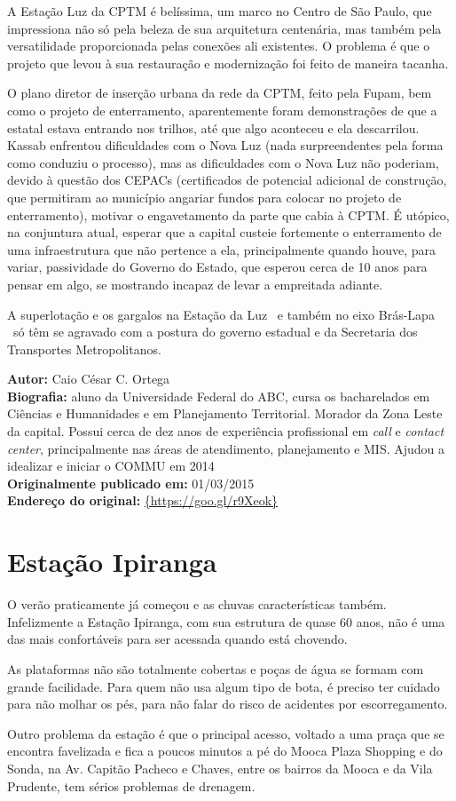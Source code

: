 \documentclass[11pt,fleqn]{book} %
\newcommand{\infocaio}[2]{\textbf{Autor:} Caio C\'{e}sar C. Ortega \\ \textbf{Biografia:} aluno da Universidade Federal do ABC, cursa os bacharelados em Ci\^{e}ncias e Humanidades e em Planejamento Territorial. Morador da Zona Leste da capital. Possui cerca de dez anos de experi\^{e}ncia profissional em \textit{call} e \textit{contact center}, principalmente nas \'{a}reas de atendimento, planejamento e MIS. Ajudou a idealizar e iniciar o COMMU em 2014 \\ \textbf{Originalmente publicado em:} {#1} \\ \textbf{Endere\c{c}o do original:} \url{{#2}}}
\begin{document}
A Estação Luz da CPTM é belíssima, um marco no Centro de São Paulo, que impressiona não só pela beleza de sua arquitetura centenária, mas também pela versatilidade proporcionada pelas conexões ali existentes. O problema é que o projeto que levou à sua restauração e modernização foi feito de maneira tacanha.

O plano diretor de inserção urbana da rede da CPTM, feito pela Fupam, bem como o projeto de enterramento, aparentemente foram demonstrações de que a estatal estava entrando nos trilhos, até que algo aconteceu e ela descarrilou. Kassab enfrentou dificuldades com o Nova Luz (nada surpreendentes pela forma como conduziu o processo), mas as dificuldades com o Nova Luz não poderiam, devido à questão dos CEPACs (certificados de potencial adicional de construção, que permitiram ao município angariar fundos para colocar no projeto de enterramento), motivar o engavetamento da parte que cabia à CPTM. É utópico, na conjuntura atual, esperar que a capital custeie fortemente o enterramento de uma infraestrutura que não pertence a ela, principalmente quando houve, para variar, passividade do Governo do Estado, que esperou cerca de 10 anos para pensar em algo, se mostrando incapaz de levar a empreitada adiante.

A superlotação e os gargalos na Estação da Luz \textemdash\ e também no eixo Brás-Lapa \textemdash\ só têm se agravado com a postura do governo estadual e da Secretaria dos Transportes Metropolitanos.

\begin{info}
	\infocaio{01/03/2015}{https://goo.gl/r9Xeok}
\end{info}

\section{Estação Ipiranga}\label{s:ipg}


O verão praticamente já começou e as chuvas características também. Infelizmente a Estação Ipiranga, com sua estrutura de quase 60 anos, não é uma das mais confortáveis para ser acessada quando está chovendo.

As plataformas não são totalmente cobertas e poças de água se formam com grande facilidade. Para quem não usa algum tipo de bota, é preciso ter cuidado para não molhar os pés, para não falar do risco de acidentes por escorregamento.

Outro problema da estação é que o principal acesso, voltado a uma praça que se encontra favelizada e fica a poucos minutos a pé do Mooca Plaza Shopping e do Sonda, na Av. Capitão Pacheco e Chaves, entre os bairros da Mooca e da Vila Prudente, tem sérios problemas de drenagem.
\end{document}
